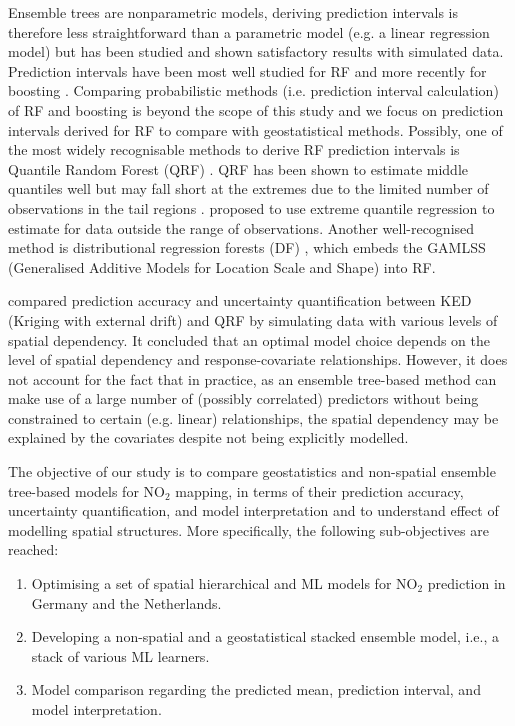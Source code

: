 \documentclass{article}
\begin{document}
Ensemble trees are nonparametric models, deriving prediction intervals is therefore less straightforward than a parametric model (e.g. a linear regression model) but has been studied and shown satisfactory results with simulated data. Prediction intervals have been most well studied for RF \citep{meinshausen2006quantile,wager2014confidence,stasinopoulos2007generalized,alakus2021rfpredinterval} and more recently for boosting \citep{duan2020ngboost,velthoen2021gradient}. Comparing probabilistic methods (i.e. prediction interval calculation) of RF and boosting is beyond the scope of this study and we focus on prediction intervals derived for RF to compare with geostatistical methods. Possibly, one of the most widely recognisable methods to derive RF prediction intervals is Quantile Random Forest (QRF) \citep{meinshausen2006quantile}. QRF has been shown to estimate middle quantiles well but may fall short at the extremes due to the limited number of observations in the tail regions \citep{velthoen2021gradient}. \cite{velthoen2021gradient} proposed to use extreme quantile regression to estimate for data outside the range of observations. Another well-recognised method is distributional regression forests (DF) \citep{schlosser2019distributional}, which embeds the GAMLSS (Generalised Additive Models for Location Scale and Shape) \citep{stasinopoulos2007generalized} into RF.  

\cite{fouedjio2019exploring} compared prediction accuracy and uncertainty quantification between KED (Kriging with external drift) and QRF by simulating data with various levels of spatial dependency. It concluded that an optimal model choice depends on the level of spatial dependency and response-covariate relationships. However, it does not account for the fact that in practice, as an ensemble tree-based method can make use of a large number of (possibly correlated) predictors without being constrained to certain (e.g. linear) relationships, the spatial dependency may be explained by the covariates despite not being explicitly modelled. 

The objective of our study is to compare geostatistics and non-spatial ensemble tree-based models for NO$_2$ mapping, in terms of their prediction accuracy, uncertainty quantification, and model interpretation and to understand effect of modelling spatial structures. More specifically, the following sub-objectives are reached:

\begin{enumerate}
    \item Optimising a set of  spatial hierarchical and ML models for NO$_2$ prediction in Germany and the Netherlands.
    
    \item Developing a non-spatial and a geostatistical stacked ensemble model, i.e., a stack of various ML learners.
    \item Model comparison regarding the predicted mean, prediction interval, and model interpretation.  
\end{enumerate}
\end{document}
